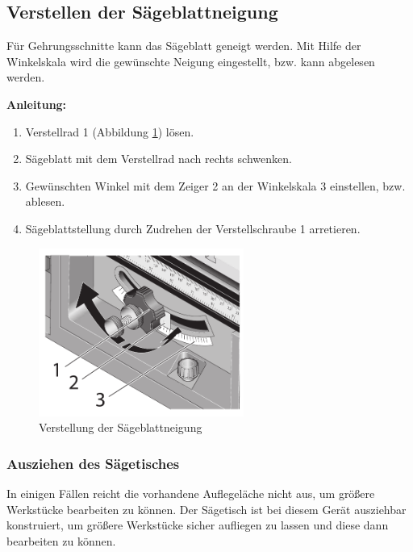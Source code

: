 \documentclass{\basedir/fablab-document}
\begin{document}
\subsection{Verstellen der Sägeblattneigung}

Für Gehrungsschnitte kann das Sägeblatt geneigt werden. Mit Hilfe der Winkelskala wird die gewünschte Neigung eingestellt, bzw. kann abgelesen werden.

\textbf{Anleitung:} \\
\renewcommand{\labelenumi}{\alph{enumi})}
\begin{enumerate}
	\item Verstellrad 1 (Abbildung \ref{fig:winkelverstellung}) lösen.
	\item Sägeblatt mit dem Verstellrad nach rechts schwenken.
	\item Gewünschten Winkel mit dem Zeiger 2 an der Winkelskala 3 einstellen, bzw. ablesen.
	\item Sägeblattstellung durch Zudrehen der Verstellschraube 1 arretieren.
\end{enumerate}

\begin{figure} [h]
	\centering
	\includegraphics[width=0.6\textwidth]{bilder/winkelverstellung.pdf}
	\caption{Verstellung der Sägeblattneigung}
	\label{fig:winkelverstellung}
\end{figure}

\subsubsection{Ausziehen des Sägetisches}

In einigen Fällen reicht die vorhandene Auflegeläche nicht aus, um größere Werkstücke bearbeiten zu können. Der Sägetisch ist bei diesem Gerät ausziehbar konstruiert, um größere Werkstücke sicher aufliegen zu lassen und diese dann bearbeiten zu können. 
\end{document}
